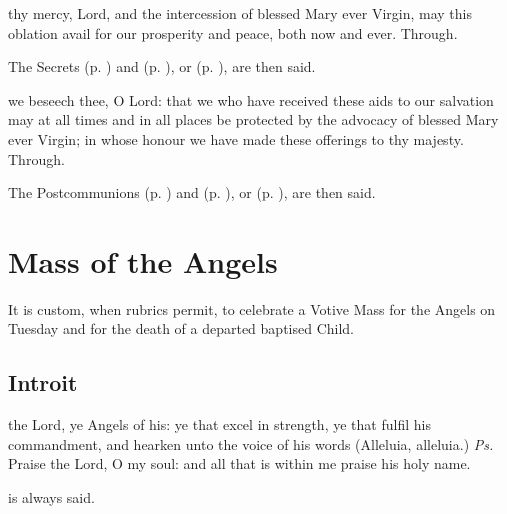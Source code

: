 
\secret
{} thy mercy, Lord, and the intercession of blessed Mary ever Virgin, may this oblation avail for our prosperity and peace, both now and ever. Through.
\begin{rubric}
    The Secrets  (p. \pageref{SPHolyGhost}) and  (p. \pageref{SPAgainst}), or  (p. \pageref{SPChiefBishop}), are then said.
\end{rubric}


\postcommunion
{} we beseech thee, O Lord: that we who have received these aids to our salvation may at all times and in all places be protected by the advocacy of blessed Mary ever Virgin; in whose honour we have made these offerings to thy majesty. Through.
\begin{rubric}
    The Postcommunions  (p. \pageref{SPHolyGhost}) and  (p. \pageref{SPAgainst}), or  (p. \pageref{SPChiefBishop}), are then said.
\end{rubric}

\clearpage

\section{Mass of the Angels}\label{MassOfTheAngels}
\fancyhead[RE,LO]{}
\begin{secrubric}
    It is custom, when rubrics permit, to celebrate a Votive Mass for the Angels on Tuesday and for the death of a departed baptised Child.
\end{secrubric}
\subsection{Introit}
 the Lord, ye Angels of his: ye that excel in strength, ye that fulfil his commandment, and hearken unto the voice of his words (Alleluia, alleluia.) \textit{Ps.} Praise the Lord, O my soul: and all that is within me praise his holy name.

\begin{rubric}
     is always said.
\end{rubric}

